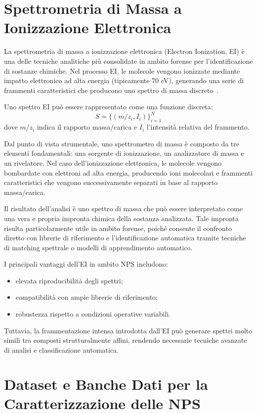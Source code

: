 \section{Spettrometria di Massa a Ionizzazione Elettronica}
\label{sec:ei}

La spettrometria di massa a ionizzazione elettronica (Electron Ionization, EI) è una delle tecniche analitiche più consolidate in ambito forense per l’identificazione di sostanze chimiche.
Nel processo EI, le molecole vengono ionizzate mediante impatto elettronico ad alta energia (tipicamente 70 eV), generando una serie di frammenti caratteristici che producono uno spettro di massa discreto~\cite{gross_mass_spec}.

Uno spettro EI può essere rappresentato come una funzione discreta:
\[
	S = \{(m/z_i, I_i)\}_{i=1}^{N}
\]
dove $m/z_i$ indica il rapporto massa/carica e $I_i$ l’intensità relativa del frammento.

Dal punto di vista strumentale, uno spettrometro di massa è composto da tre elementi
fondamentali: una sorgente di ionizzazione, un analizzatore di massa e un rivelatore.
Nel caso dell’ionizzazione elettronica, le molecole vengono bombardate con elettroni
ad alta energia, producendo ioni molecolari e frammenti caratteristici che vengono
successivamente separati in base al rapporto massa/carica.

Il risultato dell’analisi è uno spettro di massa che può essere interpretato come una
vera e propria impronta chimica della sostanza analizzata.
Tale impronta risulta particolarmente utile in ambito forense, poiché consente il
confronto diretto con librerie di riferimento e l’identificazione automatica tramite
tecniche di matching spettrale o modelli di apprendimento automatico.

I principali vantaggi dell’EI in ambito NPS includono:
\begin{itemize}
	\item elevata riproducibilità degli spettri;
	\item compatibilità con ampie librerie di riferimento;
	\item robustezza rispetto a condizioni operative variabili.
\end{itemize}

Tuttavia, la frammentazione intensa introdotta dall’EI può generare spettri molto simili tra composti strutturalmente affini, rendendo necessarie tecniche avanzate di analisi e classificazione automatica.

\section{Dataset e Banche Dati per la Caratterizzazione delle NPS}
\label{sec:datasets}

